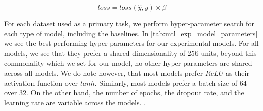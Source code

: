 \begin{equation}\label{eq:mtl_loss}
  loss = loss(\hat{y}, y) \times \beta
\end{equation}

For each dataset used as a primary task, we perform hyper-parameter search for each type of model, including the baselines. In \autoref{tab:mtl_exp_model_parameters} we see the best performing hyper-parameters for our experimental models. For all models, we see that they prefer a shared dimensionality of $256$ units, beyond this commonality which we set for our model, no other hyper-parameters are shared across all models. We do note however, that most models prefer $ReLU$ as their activation function over $tanh$. Similarly, most models prefer a batch size of $64$ over $32$. On the other hand, the number of epochs, the dropout rate, and the learning rate are variable across the models.
.

